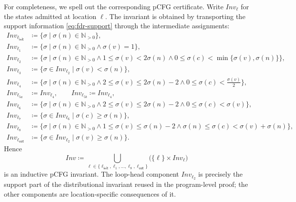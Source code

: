 For completeness, we spell out the corresponding pCFG certificate.  Write
$\mathit{Inv}_\ell$ for the states admitted at location $\ell$.  The invariant
is obtained by transporting the support information
\eqref{eq:fdr-support} through the intermediate assignments:
\begin{align*}
 \mathit{Inv}_{\ell_{\mathsf{init}}}
   &\coloneqq \{\sigma \mid \sigma(n)\in\mathbb{N}_{>0}\},\\
 \mathit{Inv}_{\ell_1}
   &\coloneqq \{\sigma \mid \sigma(n)\in\mathbb{N}_{>0}
                    \land \sigma(v)=1\},\\
 \mathit{Inv}_{\ell_2}
   &\coloneqq \{\sigma \mid \sigma(n)\in\mathbb{N}_{>0}
                    \land 1\leq\sigma(v)<2\sigma(n)
                    \land 0\leq\sigma(c)<\min\{\sigma(v),\sigma(n)\}\},\\
 \mathit{Inv}_{\ell_3}
   &\coloneqq \{\sigma\in\mathit{Inv}_{\ell_2}\mid
                    \sigma(v)<\sigma(n)\},\\
 \mathit{Inv}_{\ell_4}
   &\coloneqq \{\sigma \mid \sigma(n)\in\mathbb{N}_{>0}
                    \land 2\leq\sigma(v)\leq2\sigma(n)-2
                    \land 0\leq\sigma(c)<\tfrac{\sigma(v)}2\},\\
 \mathit{Inv}_{\ell_{5a}}
   &\coloneqq \mathit{Inv}_{\ell_4},
 \qquad
 \mathit{Inv}_{\ell_{5b}}
   \coloneqq \mathit{Inv}_{\ell_4},\\
 \mathit{Inv}_{\ell_6}
   &\coloneqq \{\sigma \mid \sigma(n)\in\mathbb{N}_{>0}
                    \land 2\leq\sigma(v)\leq2\sigma(n)-2
                    \land 0\leq\sigma(c)<\sigma(v)\},\\
 \mathit{Inv}_{\ell_7}
   &\coloneqq \{\sigma\in\mathit{Inv}_{\ell_6}\mid
                   \sigma(c)\geq\sigma(n)\},\\
 \mathit{Inv}_{\ell_8}
   &\coloneqq \{\sigma \mid \sigma(n)\in\mathbb{N}_{>0}
                    \land 1\leq\sigma(v)\leq\sigma(n)-2
                    \land \sigma(n)\leq\sigma(c)<\sigma(v)+\sigma(n)\},\\
 \mathit{Inv}_{\ell_{\mathsf{out}}}
   &\coloneqq \{\sigma\in\mathit{Inv}_{\ell_2}\mid
                    \sigma(v)\geq\sigma(n)\}.
\end{align*}
Hence
\[
    \mathit{Inv}
    \coloneqq
    \bigcup_{\ell\in\{\ell_{\mathsf{init}},\ell_1,\ldots,\ell_8,
                        \ell_{\mathsf{out}}\}}
    \bigl(\{\ell\}\times\mathit{Inv}_{\ell}\bigr)
\]
is an inductive pCFG invariant.  The loop-head component
$\mathit{Inv}_{\ell_2}$ is precisely the support part of the distributional
invariant reused in the program-level proof; the other components are
location-specific consequences of it.


